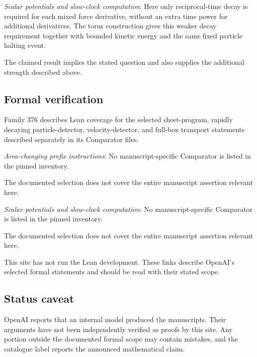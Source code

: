 \documentclass[11pt]{article}
\begin{document}
\textit{Scalar potentials and slow-clock computation}: Here only reciprocal-time decay is required for each mixed force derivative, without an extra time power for additional derivatives. The torus construction gives this weaker decay requirement together with bounded kinetic energy and the same fixed particle halting event.

The claimed result implies the stated question and also supplies the additional strength described above.

\subsection{Formal verification}
Family 376 describes Lean coverage for the selected sheet-program, rapidly decaying particle-detector, velocity-detector, and full-box transport statements described separately in its Comparator files.

\textit{Area-changing prefix instructions}: No manuscript-specific Comparator is listed in the pinned inventory.

The documented selection does not cover the entire manuscript assertion relevant here.

\textit{Scalar potentials and slow-clock computation}: No manuscript-specific Comparator is listed in the pinned inventory.

The documented selection does not cover the entire manuscript assertion relevant here.

This site has not run the Lean development. These links describe OpenAI’s selected formal statements and should be read with their stated scope.

\subsection{Status caveat}
OpenAI reports that an internal model produced the manuscripts. Their arguments have not been independently verified as proofs by this site. Any portion outside the documented formal scope may contain mistakes, and the catalogue label reports the announced mathematical claim.
\end{document}
